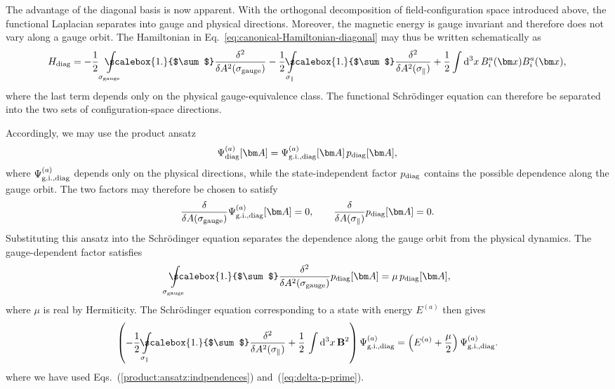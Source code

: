 \documentclass[review]{elsarticle}
\numberwithin{equation}{section}
\numberwithin{table}{section}
\numberwithin{figure}{section}
\def\d{\mathrm{d}}
\begin{document}
The advantage of the diagonal basis is now apparent. With the orthogonal decomposition of field-configuration space introduced above, the functional Laplacian separates into gauge and physical directions. Moreover, the magnetic energy is gauge invariant and therefore does not vary along a gauge orbit. The Hamiltonian in Eq.~\eqref{eq:canonical-Hamiltonian-diagonal} may thus be written schematically as
\begin{align}
    H_{\rm diag}
    =
    -\frac{1}{2}
    \int\limits_{\sigma_{\rm gauge}}\hskip-.7cm\scalebox{1.}{$\sum$}
    \frac{\delta^2}{\delta A^2(\sigma_{\rm gauge})}
    -\frac{1}{2}
    \int\limits_{\sigma_\parallel}\hskip-.5cm\scalebox{1.}{$\sum$}
    \frac{\delta^2}{\delta A^2(\sigma_\parallel)}
    +\frac{1}{2}
    \int\d^3x\,
    B_i^a(\bm x)B_i^a(\bm x),
    \label{eq:diagonal-Hamiltonian-decomposition}
\end{align}
where the last term depends only on the physical gauge-equivalence class. The functional Schr\"odinger equation can therefore be separated into the two sets of configuration-space directions.

Accordingly, we may use the product ansatz
\begin{align}
    \Psi_{\rm diag}^{(a)}[\bm A]
    =
    \Psi_{{\rm g.i.}, {\rm diag}}^{(a)}[\bm A]\,
    p_{\rm diag}[\bm A],
    \label{product:function}
\end{align}
where $\Psi_{{\rm g.i.},{\rm diag}}^{(a)}$ depends only on the physical directions, while the state-independent factor $p_{\rm diag}$ contains the possible dependence along the gauge orbit. The two factors may therefore be chosen to satisfy
\begin{align}
    \frac{\delta}{\delta A(\sigma_{\rm gauge})}
    \Psi_{{\rm g.i.},{\rm diag}}^{(a)}[\bm A]
    =
    0,
    \qquad
    \frac{\delta}{\delta A(\sigma_\parallel)}
    p_{\rm diag}[\bm A]
    =
    0.
    \label{product:ansatz:indpendences}
\end{align}
Substituting this ansatz into the Schr\"odinger equation separates the dependence along the gauge orbit from the physical dynamics. The gauge-dependent factor satisfies
\begin{align}
    \int\limits_{\sigma_{\rm gauge}}\hskip-.7cm\scalebox{1.}{$\sum$}
    \frac{\delta^2}{\delta A^2(\sigma_{\rm gauge})}
    p_{\rm diag}[\bm A]
    =
    \mu\,p_{\rm diag}[\bm A],
    \label{eq:delta-p-prime}
\end{align}
where $\mu$ is real by Hermiticity. The Schr\"odinger equation  corresponding to a state with energy $E^{(a)}$ then gives
\begin{align}
\left(-\frac{1}{2}\int\limits_{\sigma_{\parallel}}\hskip-.5cm\scalebox{1.}{$\sum$}  \frac{\delta^2}{\delta A^2(\sigma_{\parallel})}
+\frac{1}{2}\,\int {\rm d}^3x\, \mathbf B^2\right){\Psi}_\text{g.i.,diag}^{(a)}
=\left(E^{(a)}+\frac{\mu}{2}\right){\Psi}_\text{g.i.,diag}^{(a)}.
\end{align}
where we have used Eqs.~(\ref{product:ansatz:indpendences}) and~(\ref{eq:delta-p-prime}).
\end{document}
